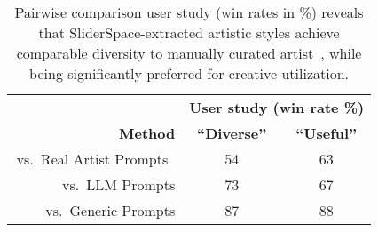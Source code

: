 \begin{table}
    \centering
    \small
    \begin{tabular}{rcc}
       & \multicolumn{2}{c}{\textbf{User study (win rate \%)}} \\
        \textbf{Method} & \textbf{``Diverse''} & \textbf{``Useful''}  \\
        \hline
        \,vs.\, Real Artist Prompts~\cite{parrotzone} &  54 & 63  \\
        \,vs.\, LLM Prompts & 73 & 67 \\
        \,vs.\, Generic Prompts & 87 & 88   \\

    \end{tabular}
    \caption{Pairwise comparison user study (win rates in \%) reveals that SliderSpace-extracted artistic styles achieve comparable diversity to manually curated artist~\cite{parrotzone}, while being significantly preferred for creative utilization. 
    }
    \label{tab:userart}
\end{table}